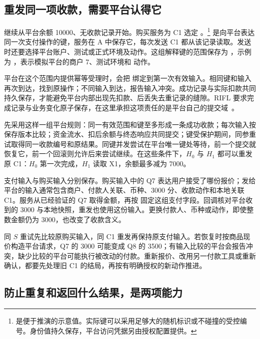 \subsection*{重发同一项收款，需要平台认得它}

继续从平台余额 10000、无收款记录开始。购买服务为 C1 选定 。\footnote{ 是便于推演的示意值。实际键可以采用足够大的随机标识或不碰撞的受控编号。身份值持久保存，平台访问凭据另由授权配置提供。} 是向平台表达同一次支付操作的键，服务在 A 中保存它，每次发送 C1 都从该记录读取。发送时还要选择平台账户、测试或正式环境及动作。这组解释键的范围保存为 ，示例为 ，表示模拟平台的商户 7、测试环境和  动作。

平台在这个范围内提供幂等受理时，会把  绑定到第一次有效输入。相同键和输入再次到达，找到原操作；不同输入到达，报告输入冲突。成功记录与实际扣款共同持久保存，才能避免平台内部出现先扣款、后丢失去重记录的缝隙。RIFL 要求完成记录与业务变化原子保存，在这里承担这项责任的是平台自己的提交域~\cite{rifl}。


先采用这样一组平台规则：同一有效范围和键至多形成一条成功收款；每次输入按保存版本比较；资金流水、扣后余额与终态响应共同提交；键受保护期间，同参重试取得同一收款编号和原结果。同键并发尝试在平台唯一键处等待，前一个提交就恢复它，前一个回滚则允许后来尝试继续。在这些条件下，\(H_0\) 与 \(H_1\) 都可以重发原 C1：\(H_0\) 第一次完成，\(H_1\) 读取 X1，余额最多减为 7000。

支付输入与购买输入分别保存。购买输入中的 Q7 表达用户接受了哪份报价；发给平台的输入通常包含商户、付款人关联、币种、3000 分、收款动作和本地关联 C1。服务从已经验证的 Q7 取得金额，再按  固定这组支付字段。回调核对平台收到的 3000 与本地快照，重发也使用这份输入。更换付款人、币种或动作，即使整数金额仍为 3000，也改变了收款含义。

同 \(S\) 重试先比较原购买输入，同 C1 重发再保持原支付输入。若恢复时按商品现价构造平台请求，Q7 的 3000 可能变成 Q8 的 3500；有输入比较的平台会报告冲突，缺少比较的平台可能执行被改动的付款。重新报价、改用另一付款工具或重新确认，都要先处理旧 C1 的结局，再按有明确授权的新动作推进。

\subsection*{防止重复和返回什么结果，是两项能力}

